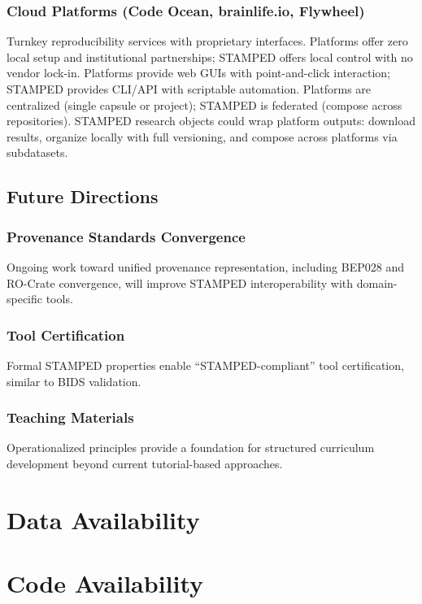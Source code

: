 \documentclass{article}
\begin{document}
\subsubsection{Cloud Platforms (Code Ocean, brainlife.io, Flywheel)}
Turnkey reproducibility services with proprietary interfaces.
Platforms offer zero local setup and institutional partnerships; STAMPED offers local control with no vendor lock-in.
Platforms provide web GUIs with point-and-click interaction; STAMPED provides CLI/API with scriptable automation.
Platforms are centralized (single capsule or project); STAMPED is federated (compose across repositories).
STAMPED research objects could wrap platform outputs: download results, organize locally with full versioning, and compose across platforms via subdatasets.

\subsection{Future Directions}

\subsubsection{Provenance Standards Convergence}
Ongoing work toward unified provenance representation, including BEP028 and RO-Crate convergence, will improve STAMPED interoperability with domain-specific tools.

\subsubsection{Tool Certification}
Formal STAMPED properties enable ``STAMPED-compliant'' tool certification, similar to BIDS validation.

\subsubsection{Teaching Materials}
Operationalized principles provide a foundation for structured curriculum development beyond current tutorial-based approaches.
\section{Data Availability}
\section{Code Availability}


\end{document}
